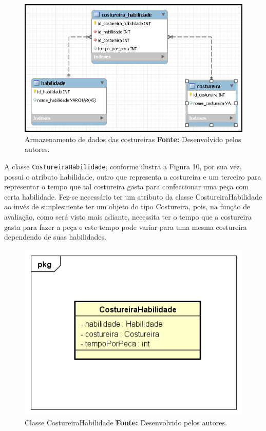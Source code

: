 \newpage

\begin{figure}[h!]
	\centerline{\includegraphics[scale=0.9]{./imagens/costureira_habilidade_tabela.png}}
	\caption[Armazenamento de dados das costureiras]
	{Armazenamento de dados das costureiras \textbf{Fonte:} Desenvolvido pelos
	autores.}
	\label{fig:exemplo1}
\end{figure}


\par A classe \texttt{CostureiraHabilidade}, conforme ilustra a Figura 10, por
sua vez, possui o atributo habilidade, outro que
representa a costureira e um terceiro para representar o tempo que tal
costureira gasta para confeccionar uma peça com certa habilidade. Fez-se
necessário ter um atributo da classe CostureiraHabilidade ao invés de simplesmente ter um objeto do tipo Costureira, pois, 
na função de avaliação, como será visto mais adiante, necessita ter o tempo
que a costureira gasta para fazer a peça e este tempo pode variar para uma mesma costureira dependendo de suas habilidades.

\begin{figure}[h!]
	\centerline{\includegraphics[scale=0.9]{./imagens/costureiraHabilidade_class.png}}
	\caption[Classe CostureiraHabilidade]
	{Classe CostureiraHabilidade \textbf{Fonte:} Desenvolvido pelos autores.}
	\label{fig:exemplo1}
\end{figure}

